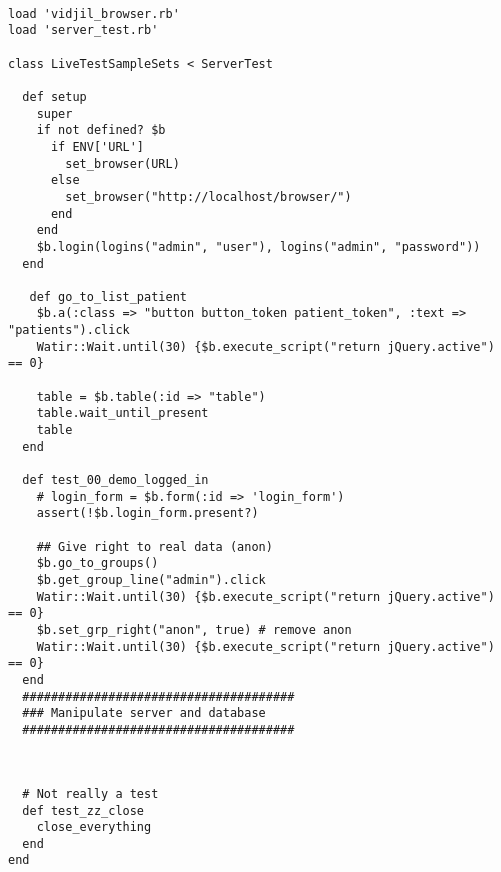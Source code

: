 
\begin{verbatim}

load 'vidjil_browser.rb'
load 'server_test.rb'

class LiveTestSampleSets < ServerTest

  def setup
    super
    if not defined? $b
      if ENV['URL']
        set_browser(URL)
      else
        set_browser("http://localhost/browser/")
      end
    end
    $b.login(logins("admin", "user"), logins("admin", "password"))
  end

   def go_to_list_patient
    $b.a(:class => "button button_token patient_token", :text => "patients").click
    Watir::Wait.until(30) {$b.execute_script("return jQuery.active") == 0}

    table = $b.table(:id => "table")
    table.wait_until_present
    table
  end

  def test_00_demo_logged_in
    # login_form = $b.form(:id => 'login_form')
    assert(!$b.login_form.present?)

    ## Give right to real data (anon)
    $b.go_to_groups()
    $b.get_group_line("admin").click
    Watir::Wait.until(30) {$b.execute_script("return jQuery.active") == 0}
    $b.set_grp_right("anon", true) # remove anon
    Watir::Wait.until(30) {$b.execute_script("return jQuery.active") == 0}
  end
  ######################################
  ### Manipulate server and database
  ######################################


\end{verbatim}



\begin{verbatim}

  # Not really a test
  def test_zz_close
    close_everything
  end
end
\end{verbatim}
